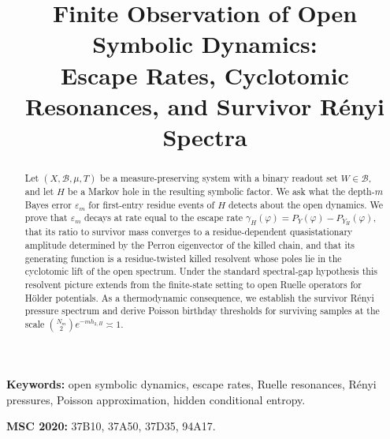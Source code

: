 \documentclass[12pt,a4paper]{article}
\title{Finite Observation of Open Symbolic Dynamics:\\
Escape Rates, Cyclotomic Resonances, and Survivor R\'enyi Spectra}
\author{}
\date{}
\theoremstyle{plain}
\theoremstyle{definition}
\theoremstyle{remark}
\begin{document}
\maketitle

\begin{abstract}
Let $(X,\mathcal{B},\mu,T)$ be a measure-preserving system with a binary
readout set $W\in\mathcal{B}$, and let $H$ be a Markov hole in the
resulting symbolic factor.  We ask what the depth-$m$ Bayes error
$\varepsilon_m$ for first-entry residue events of $H$ detects about the
open dynamics.  We prove that $\varepsilon_m$ decays at rate equal to the
escape rate $\gamma_H(\varphi)=P_Y(\varphi)-P_{Y_H}(\varphi)$, that its
ratio to survivor mass converges to a residue-dependent quasistationary
amplitude determined by the Perron eigenvector of the killed chain, and
that its generating function is a residue-twisted killed resolvent whose
poles lie in the cyclotomic lift of the open spectrum.  Under the
standard spectral-gap hypothesis this resolvent picture extends from the
finite-state setting to open Ruelle operators for H\"older potentials.
As a thermodynamic consequence, we establish the survivor R\'enyi
pressure spectrum and derive Poisson birthday thresholds for surviving
samples at the scale $\binom{N_m}{2}e^{-mh_{2,H}}\asymp 1$.
\end{abstract}

{\small
\noindent\textbf{Keywords:}
open symbolic dynamics, escape rates, Ruelle resonances, R\'enyi
pressures, Poisson approximation, hidden conditional entropy.

\medskip
\noindent\textbf{MSC 2020:}
37B10, 37A50, 37D35, 94A17.
}

\bigskip













\end{document}
